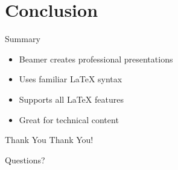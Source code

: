 \documentclass{beamer}
\begin{document}
\section{Conclusion}

\begin{frame}{Summary}
  \begin{itemize}
    \item Beamer creates professional presentations
    \item Uses familiar LaTeX syntax
    \item Supports all LaTeX features
    \item Great for technical content
  \end{itemize}
\end{frame}

\begin{frame}{Thank You}
  \centering
  \Huge Thank You!
  
  \bigskip
  \normalsize
  Questions?
\end{frame}
\end{document}
